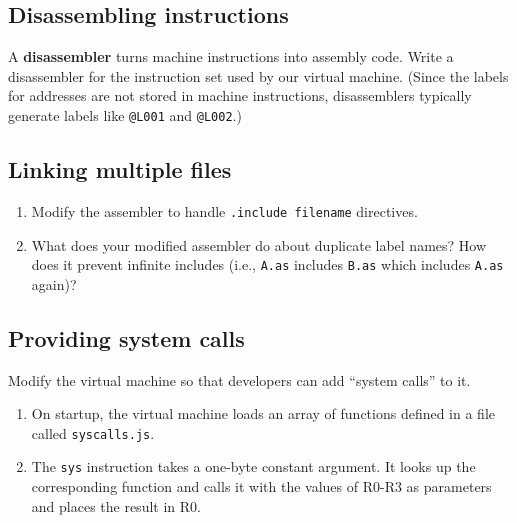 \documentclass[krantzl]{krantz}
\newcommand{\glossref}[1]{\textbf{#1}}
\begin{document}
\subsection*{Disassembling instructions}


A \glossref{disassembler} turns machine instructions into assembly code.
Write a disassembler for the instruction set used by our virtual machine.
(Since the labels for addresses are not stored in machine instructions,
disassemblers typically generate labels like \texttt{@L001} and \texttt{@L002}.)

\subsection*{Linking multiple files}

\begin{enumerate}

\item 

Modify the assembler to handle \texttt{.include filename} directives.



\item 

What does your modified assembler do about duplicate label names?
    How does it prevent infinite includes
    (i.e., \texttt{A.as} includes \texttt{B.as} which includes \texttt{A.as} again)?



\end{enumerate}

\subsection*{Providing system calls}


Modify the virtual machine so that developers can add “system calls” to it.

\begin{enumerate}

\item 

On startup,
    the virtual machine loads an array of functions defined in a file called \texttt{syscalls.js}.



\item 

The \texttt{sys} instruction takes a one-byte constant argument.
    It looks up the corresponding function and calls it with the values of R0-R3 as parameters
    and places the result in R0.



\end{enumerate}
\end{document}
